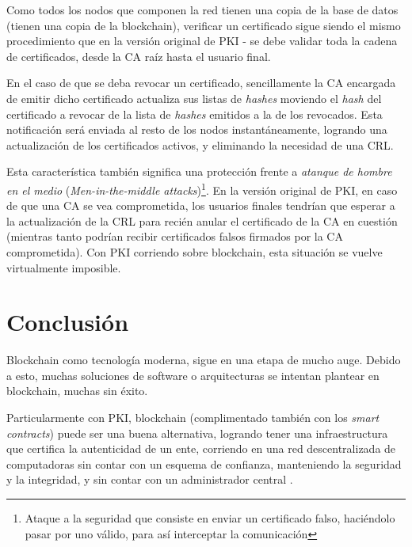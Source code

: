 Como todos los nodos que componen la red tienen una copia de la base de datos (tienen una copia de la blockchain), verificar un certificado sigue siendo el mismo procedimiento que en la versión original de PKI - se debe validar toda la cadena de certificados, desde la CA raíz hasta el usuario final.

En el caso de que se deba revocar un certificado, sencillamente la CA encargada de emitir dicho certificado actualiza sus listas de \emph{hashes} moviendo el \emph{hash} del certificado a revocar de la lista de \emph{hashes} emitidos a la de los revocados. Esta notificación será enviada al resto de los nodos instantáneamente, logrando una actualización de los certificados activos, y eliminando la necesidad de una CRL. 

Esta característica también significa una protección frente a \emph{atanque de hombre en el medio} (\emph{Men-in-the-middle attacks})\footnote{Ataque a la seguridad que consiste en enviar un certificado falso, haciéndolo pasar por uno válido, para así interceptar la comunicación}. En la versión original de PKI, en caso de que una CA se vea comprometida, los usuarios finales tendrían que esperar a la actualización de la CRL para recién anular el certificado de la CA en cuestión (mientras tanto podrían recibir certificados falsos firmados por la CA comprometida). Con PKI corriendo sobre blockchain, esta situación se vuelve virtualmente imposible. 

\section{Conclusión}

Blockchain como tecnología moderna, sigue en una etapa de mucho auge. Debido a esto, muchas soluciones de software o arquitecturas se intentan plantear en blockchain, muchas sin éxito.

Particularmente con PKI, blockchain (complimentado también con los \emph{smart contracts}) puede ser una buena alternativa, logrando tener una infraestructura que certifica la autenticidad de un ente, corriendo en una red descentralizada de computadoras sin contar con un esquema de confianza, manteniendo la seguridad y la integridad, y sin contar con un administrador central \autocite{SmartContractsUseCases}.



\clearpage
\printbibliography


